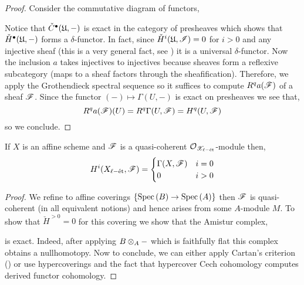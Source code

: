 \documentclass[12pt]{article}
\begin{document}
\begin{proof}
Consider the commutative diagram of functors,
\begin{center}
\end{center}
Notice that $\check{C}^\bullet(\mathfrak{U}, -)$ is exact in the category of presheaves which shows that $\check{H}^\bullet(\mathfrak{U}, -)$ forms a $\delta$-functor. In fact, since $\check{H}^i(\mathfrak{U}, \mathscr{I}) = 0$ for $i > 0$ and any injective sheaf (this is a very general fact, see ) it is a universal $\delta$-functor. Now the inclusion $a$ takes injectives to injectives because sheaves form a reflexive subcategory (maps to a sheaf factors through the sheafification). Therefore, we apply the Grothendieck spectral sequence so it suffices to compute $R^q a(\mathscr{F})$ of a sheaf $\mathscr{F}$. Since the functor $(-) \mapsto \Gamma(U, -)$ is exact on presheaves we see that,
\[ R^q a(\mathscr{F})(U) = R^q \Gamma(U, \mathscr{F}) = H^q(U, \mathscr{F}) \]
so we conclude.
\end{proof}

\begin{theorem}
If $X$ is an affine scheme and $\mathscr{F}$ is a quasi-coherent $\mathcal{O}_{\mathscr{X}_{\ell-\text{\'{e}t}}}$-module then,
\[ H^i(X_{\ell-\text{\'{e}t}}, \mathscr{F}) = 
\begin{cases}
\Gamma(X, \mathscr{F}) & i = 0
\\
0 & i > 0
\end{cases} \]
\end{theorem}

\begin{proof}
We refine to affine coverings $\{ \mathrm{Spec}\left( B \right) \to \mathrm{Spec}\left( A \right) \}$ then $\mathscr{F}$ is quasi-coherent (in all equivalent notions) and hence arises from some $A$-module $M$. To show that $\check{H}^{>0} = 0$ for this covering we show that the Amistur complex,
\begin{center}
\end{center}
is exact. Indeed, after applying $B \otimes_A -$ which is faithfully flat this complex obtains a nullhomotopy. Now to conclude, we can either apply Cartan's criterion () or use hypercoverings and the fact that hypercover Cech cohomology computes derived functor cohomology.
\end{proof}
\end{document}
